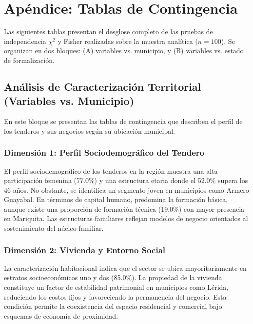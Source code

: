 \documentclass[11pt,a4paper]{article}
\begin{document}
\newpage
\nocite{*}



\newpage
\appendix
\section{Apéndice: Tablas de Contingencia}

Las siguientes tablas presentan el desglose completo de las pruebas de independencia $\chi^{2}$ y Fisher realizadas sobre la muestra analítica ($n = 100$). Se organizan en dos bloques: (A)  variables vs. municipio, y (B) variables vs. estado de formalización.

\subsection{Análisis de Caracterización Territorial (Variables vs. Municipio)}
En este bloque se presentan las tablas de contingencia que describen el perfil de los tenderos y sus negocios según su ubicación municipal.

\subsubsection{Dimensión 1: Perfil Sociodemográfico del Tendero}





\par
El perfil sociodemográfico de los tenderos en la región muestra una alta participación femenina (77.0\%) y una estructura etaria donde el 52.0\% supera los 46 años. No obstante, se identifica un segmento joven en municipios como Armero Guayabal. En términos de capital humano, predomina la formación básica, aunque existe una proporción de formación técnica (19.0\%) con mayor presencia en Mariquita. Las estructuras familiares reflejan modelos de negocio orientados al sostenimiento del núcleo familiar.

\subsubsection{Dimensión 2: Vivienda y Entorno Social}


\par
La caracterización habitacional indica que el sector se ubica mayoritariamente en estratos socioeconómicos uno y dos (85.0\%). La propiedad de la vivienda constituye un factor de estabilidad patrimonial en municipios como Lérida, reduciendo los costos fijos y favoreciendo la permanencia del negocio. Esta condición permite la coexistencia del espacio residencial y comercial bajo esquemas de economía de proximidad.
\end{document}
